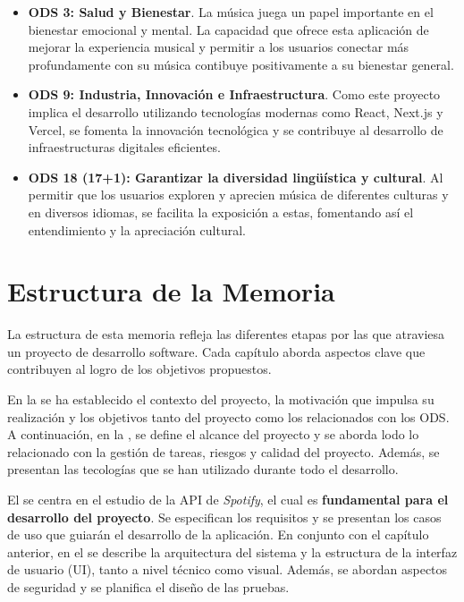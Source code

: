 \begin{itemize}
    \item \textbf{ODS 3: Salud y Bienestar}. La música juega un papel importante en el bienestar emocional y mental. La capacidad que ofrece esta aplicación de mejorar la experiencia musical y permitir a los usuarios conectar más profundamente con su música contibuye positivamente a su bienestar general.
    \item \textbf{ODS 9: Industria, Innovación e Infraestructura}. Como este proyecto implica el desarrollo utilizando tecnologías modernas como React, Next.js y Vercel, se fomenta la innovación tecnológica y se contribuye al desarrollo de infraestructuras digitales eficientes.
    \item \textbf{ODS 18 (17+1): Garantizar la diversidad lingüística y cultural}. Al permitir que los usuarios exploren y aprecien música de diferentes culturas y en diversos idiomas, se facilita la exposición a estas, fomentando así el entendimiento y la apreciación cultural.
\end{itemize}

\section{Estructura de la Memoria}

La estructura de esta memoria refleja las diferentes etapas por las que atraviesa un proyecto de desarrollo software. Cada capítulo aborda aspectos clave que contribuyen al logro de los objetivos propuestos.

En la  se ha establecido el contexto del proyecto, la motivación que impulsa su realización y los objetivos tanto del proyecto como los relacionados con los ODS. A continuación, en la , se define el alcance del proyecto y se aborda lodo lo relacionado con la gestión de tareas, riesgos y calidad del proyecto. Además, se presentan las tecologías que se han utilizado durante todo el desarrollo.

El  se centra en el estudio de la API de \textit{Spotify}, el cual es \textbf{fundamental para el desarrollo del proyecto}. Se especifican los requisitos y se presentan los casos de uso que guiarán el desarrollo de la aplicación. En conjunto con el capítulo anterior, en el  se describe la arquitectura del sistema y la estructura de la interfaz de usuario (UI), tanto a nivel técnico como visual. Además, se abordan aspectos de seguridad y se planifica el diseño de las pruebas.

